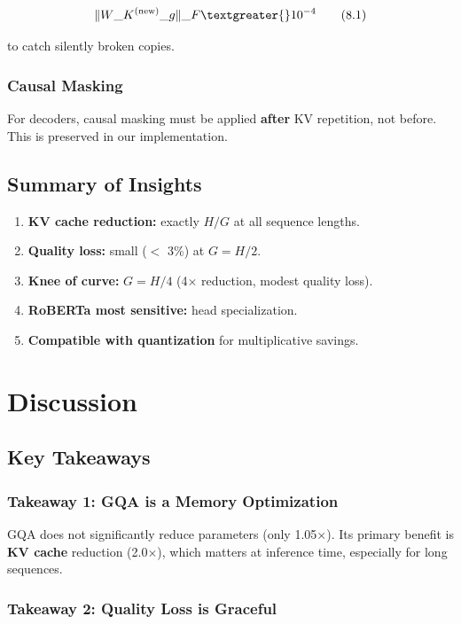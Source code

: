 \[
\|W\_K^{(\text{new})}\_g\|\_F \textgreater{} 10^{-4}
\tag{8.1}
\]

to catch silently broken copies.

\subsubsection{Causal Masking}

For decoders, causal masking must be applied \textbf{after} KV repetition, not 
before. This is preserved in our implementation.

\subsection{Summary of Insights}

\begin{enumerate}
\item \textbf{KV cache reduction:} exactly $H / G$ at all sequence lengths.
\item \textbf{Quality loss:} small ($<$ 3\%) at $G = H/2$.
\item \textbf{Knee of curve:} $G = H/4$ (4$\times$ reduction, modest quality loss).
\item \textbf{RoBERTa most sensitive:} head specialization.
\item \textbf{Compatible with quantization} for multiplicative savings.
\end{enumerate}


\section{Discussion}

\subsection{Key Takeaways}

\subsubsection{Takeaway 1: GQA is a Memory Optimization}

GQA does not significantly reduce parameters (only 1.05$\times$). Its 
primary benefit is \textbf{KV cache} reduction (2.0$\times$), which matters at 
inference time, especially for long sequences.

\subsubsection{Takeaway 2: Quality Loss is Graceful}

